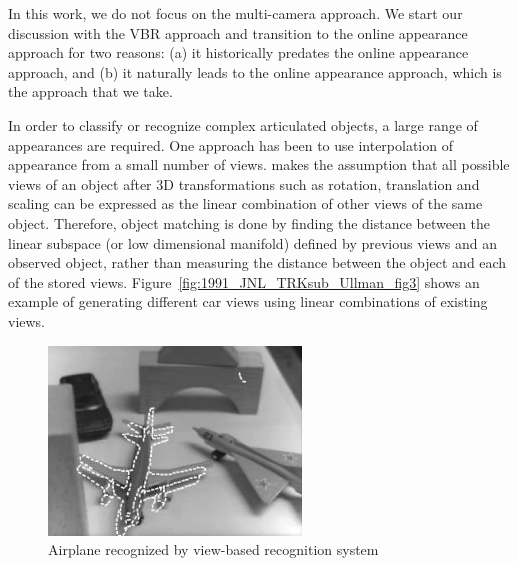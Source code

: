 In this work, we do not focus on the multi-camera approach.  We start our discussion with the VBR approach and transition to the online appearance approach for two reasons: (a) it historically predates the online appearance approach, and (b) it naturally leads to the online appearance approach, which is the approach that we take.

In order to classify or recognize complex articulated objects, a large range of appearances are required.  One approach has been to use interpolation of appearance from a small number of views.  \cite{1991_JNL_Recog_Ullman} makes the assumption that all possible views of an object after 3D transformations such as rotation, translation and scaling can be expressed as the linear combination of other views of the same object.  Therefore, object matching is done by finding the distance between the linear subspace (or low dimensional manifold) defined by previous views and an observed object, rather than measuring the distance between the object and each of the stored views.  Figure~\ref{fig:1991_JNL_TRKsub_Ullman_fig3} shows an example of generating different car views using linear combinations of existing views.  



								\begin{figure}[t]
								\center
								\includegraphics[width=0.6\textwidth]{thesis/1992_JNL_VBR_Breuel_fig1.png}
								\caption{Airplane recognized by view-based recognition system \cite{1992_JNL_VBR_Breuel}}
								\label{fig:1992_JNL_VBR_Breuel_fig1}
								\end{figure}


